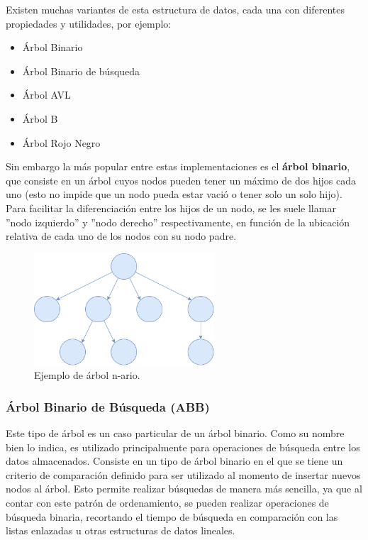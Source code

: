 \documentclass[titlepage,a4paper]{article}
\begin{document}
Existen muchas variantes de esta estructura de datos, cada una con diferentes
propiedades y utilidades, por ejemplo: 

\begin{itemize}
	\item Árbol Binario
	\item Árbol Binario de búsqueda
	\item Árbol AVL
	\item Árbol B
	\item Árbol Rojo Negro
\end{itemize}

Sin embargo la más popular entre estas implementaciones es el \textbf{árbol
binario}, que consiste en un árbol cuyos nodos pueden tener un máximo de dos
hijos cada uno (esto no impide que un nodo pueda estar vació o tener solo un
solo hijo). Para facilitar la diferenciación entre los hijos de un nodo, se les
suele llamar ''nodo izquierdo'' y ''nodo derecho'' respectivamente, en función
de la ubicación relativa de cada uno de los nodos con su nodo padre.

\begin{figure}[H]
\centering
\includegraphics[width=0.6\textwidth]{arbol_eneario.png}
\caption{\label{fig:seq01}Ejemplo de árbol n-ario.}
\end{figure}


									 \subsubsection{Árbol Binario de Búsqueda (ABB)}

Este tipo de árbol es un caso particular de un árbol binario. Como su nombre
bien lo indica, es utilizado principalmente para operaciones de búsqueda entre
los datos almacenados. Consiste en un tipo de árbol binario en el que se tiene
un criterio de comparación definido para ser utilizado al momento
de insertar nuevos nodos al árbol. Esto permite realizar búsquedas de manera
más sencilla, ya que al contar con este patrón de ordenamiento, se pueden
realizar operaciones de búsqueda binaria, recortando el tiempo de búsqueda en
comparación con las listas enlazadas u otras estructuras de datos lineales.
\end{document}
